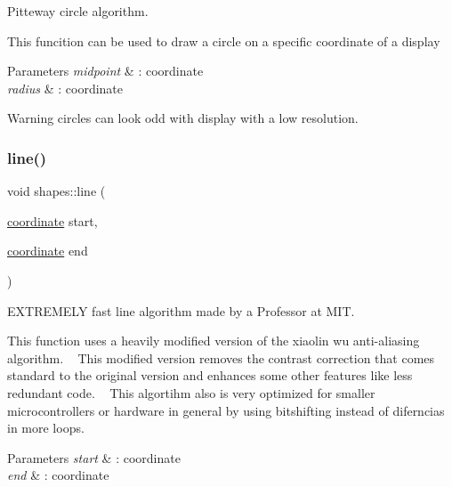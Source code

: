 Pitteway circle algorithm. 

This funcition can be used to draw a circle on a specific coordinate of a display 
\begin{DoxyParams}{Parameters}
{\em midpoint} & \+: coordinate \\
\hline
{\em radius} & \+: coordinate \\
\hline
\end{DoxyParams}
\begin{DoxyWarning}{Warning}
circles can look odd with display with a low resolution. 
\end{DoxyWarning}
\mbox{\label{classshapes_a159e2c9aac754341cb42cc4173175bb7}} 
\subsubsection{\texorpdfstring{line()}{line()}}
{\footnotesize\ttfamily void shapes\+::line (\begin{DoxyParamCaption}\item[{\hyperlink{classcoordinate}{coordinate}}]{start,  }\item[{\hyperlink{classcoordinate}{coordinate}}]{end }\end{DoxyParamCaption})\hspace{0.3cm}{\ttfamily [inline]}}



E\+X\+T\+R\+E\+M\+E\+LY fast line algorithm made by a Professor at M\+IT. 

This function uses a heavily modified version of the xiaolin wu anti-\/aliasing algorithm. ~\newline
This modified version removes the contrast correction that comes standard to the original version and enhances some other features like less redundant code. ~\newline
This algortihm also is very optimized for smaller microcontrollers or hardware in general by using bitshifting instead of diferncias in more loops. 
\begin{DoxyParams}{Parameters}
{\em start} & \+: coordinate \\
\hline
{\em end} & \+: coordinate \\
\hline
\end{DoxyParams}
\mbox{\label{classshapes_a129d716caf5f38d1bed560590e9b7bbc}} 
